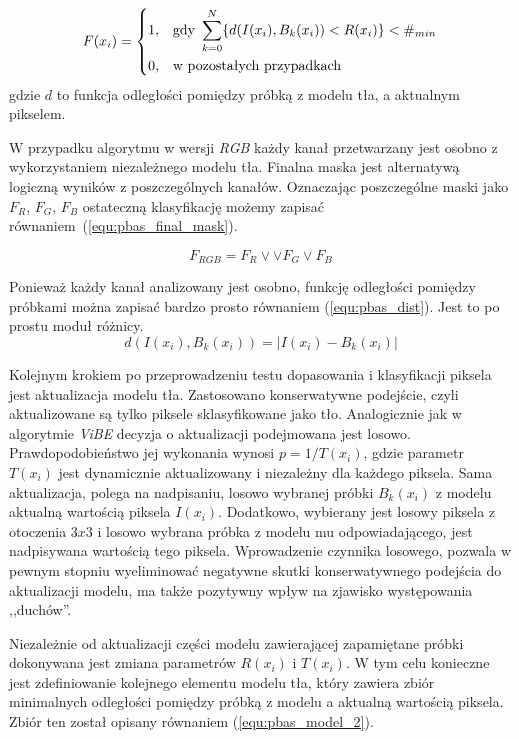 	\begin{equation}
	    F(x_i) = 
		\begin{dcases}
    		1, & \text{gdy } \sum_{k=0}^{N} \{ d(I(x_i), B_k(x_i)) < R(x_i) \} < \#_{min} \\
    		0, & \text{w pozostałych przypadkach} 
		\end{dcases}
	\label{equ:pbas_test}	
	\end{equation}
\noindent gdzie $d$ to funkcja odległości pomiędzy próbką z modelu tła, a aktualnym pikselem. 

W przypadku algorytmu w wersji \textit{RGB} każdy kanał przetwarzany jest osobno z wykorzystaniem niezależnego modelu tła. 
Finalna maska jest alternatywą logiczną wyników z poszczególnych kanałów. 
Oznaczając poszczególne maski jako $F_R$, $F_G$, $F_B$ ostateczną klasyfikację możemy zapisać równaniem~(\ref{equ:pbas_final_mask}).

    \begin{equation}
        F_{RGB} = F_R \lor \lor F_G \lor F_B
    \label{equ:pbas_final_mask}
    \end{equation}


Ponieważ każdy kanał analizowany jest osobno, funkcję odległości pomiędzy próbkami można zapisać bardzo prosto równaniem (\ref{equ:pbas_dist}). Jest to po prostu moduł różnicy.
	\begin{equation}
		d(I(x_i),B_k(x_i)) = | I(x_i) - B_k(x_i) |
	\label{equ:pbas_dist}	
	\end{equation}

Kolejnym krokiem po przeprowadzeniu testu dopasowania i klasyfikacji piksela jest aktualizacja modelu tła. 
Zastosowano konserwatywne podejście, czyli aktualizowane są tylko piksele sklasyfikowane jako tło. 
Analogicznie jak w algorytmie \textit{ViBE} decyzja o aktualizacji podejmowana jest losowo. 
Prawdopodobieństwo jej wykonania wynosi $p = 1/T(x_i)$, gdzie parametr $T(x_i)$ jest dynamicznie aktualizowany i niezależny dla każdego piksela. Sama aktualizacja, polega na nadpisaniu, losowo wybranej próbki $B_k(x_i)$ z modelu aktualną wartością piksela $I(x_i)$. Dodatkowo, wybierany jest losowy piksela z otoczenia $3x3$ i losowo wybrana próbka z modelu mu odpowiadającego, jest nadpisywana wartością tego piksela. Wprowadzenie czynnika losowego, pozwala w pewnym stopniu wyeliminować negatywne skutki konserwatywnego podejścia do aktualizacji modelu, ma także pozytywny wpływ na zjawisko występowania ,,duchów''.

Niezależnie od aktualizacji części modelu zawierającej zapamiętane próbki dokonywana jest zmiana parametrów $R(x_i)$ i $T(x_i)$. 
W tym celu konieczne jest zdefiniowanie kolejnego elementu modelu tła, który zawiera zbiór minimalnych odległości pomiędzy próbką z modelu a aktualną wartością piksela. 
Zbiór ten został opisany równaniem (\ref{equ:pbas_model_2}). 
 

